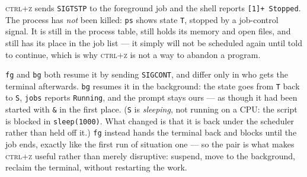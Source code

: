
\textsc{ctrl+z} sends \texttt{SIGTSTP} to the foreground job and the shell
reports \texttt{[1]+ Stopped}. The process has \emph{not} been killed: \texttt{ps}
shows state \texttt{T}, stopped by a job-control signal. It is still in the
process table, still holds its memory and open files, and still has its place in
the job list --- it simply will not be scheduled again until told to continue,
which is why \textsc{ctrl+z} is not a way to abandon a program.

\texttt{fg} and \texttt{bg} both resume it by sending \texttt{SIGCONT}, and
differ only in who gets the terminal afterwards. \texttt{bg} resumes it in the
background: the state goes from \texttt{T} back to \texttt{S}, \texttt{jobs}
reports \texttt{Running}, and the prompt stays ours --- as though it had been
started with \texttt{\&} in the first place. (\texttt{S} is \emph{sleeping}, not
running on a CPU: the script is blocked in \texttt{sleep(1000)}. What changed is
that it is back under the scheduler rather than held off it.) \texttt{fg}
instead hands the terminal back and blocks until the job ends, exactly like the
first run of situation one --- so the pair is what makes \textsc{ctrl+z} useful
rather than merely disruptive: suspend, move to the background, reclaim the
terminal, without restarting the work.
